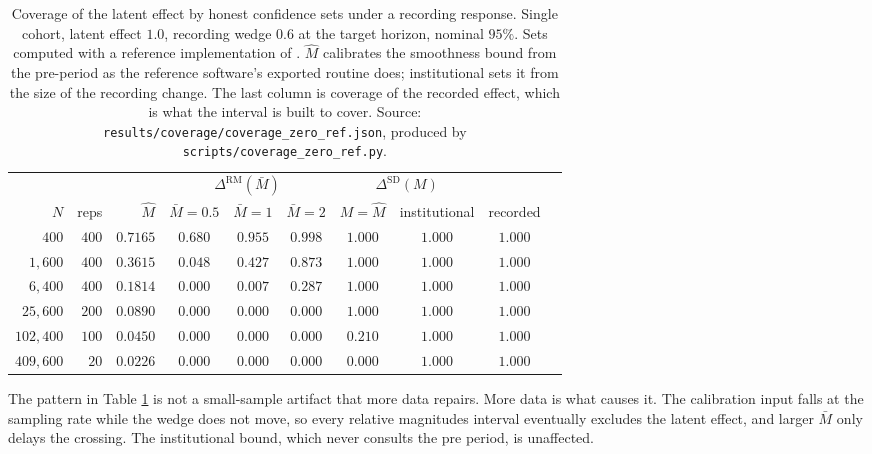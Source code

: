 \documentclass[12pt]{article}
\theoremstyle{definition}
\numberwithin{equation}{section}
\begin{document}
\begin{table}[t]
\centering
\caption{Coverage of the latent effect by honest confidence sets under a
recording response. Single cohort, latent effect $1.0$, recording wedge $0.6$ at
the target horizon, nominal $95\%$. Sets computed with a reference
implementation of \citet{rambachan2023credible}. $\widehat M$ calibrates the
smoothness bound from the pre-period as the reference software's exported
routine does; institutional sets it from the size of the recording change. The
last column is coverage of the recorded effect, which is what the interval is
built to cover. Source: \texttt{results/coverage/coverage\_zero\_ref.json},
produced by \texttt{scripts/coverage\_zero\_ref.py}.}
\label{tab:cov}
\begin{tabular}{rrrccccccc}
\toprule
& & & \multicolumn{3}{c}{$\Delta^{\mathrm{RM}}(\bar M)$}
& \multicolumn{2}{c}{$\Delta^{\mathrm{SD}}(M)$} & \\
\cmidrule(lr){4-6}\cmidrule(lr){7-8}
$N$ & reps & $\widehat M$ & $\bar M = 0.5$ & $\bar M = 1$ & $\bar M = 2$
& $M = \widehat M$ & institutional & recorded \\
\midrule
$400$ & $400$ & $0.7165$ & $0.680$ & $0.955$ & $0.998$ & $1.000$ & $1.000$ & $1.000$ \\
$1{,}600$ & $400$ & $0.3615$ & $0.048$ & $0.427$ & $0.873$ & $1.000$ & $1.000$ & $1.000$ \\
$6{,}400$ & $400$ & $0.1814$ & $0.000$ & $0.007$ & $0.287$ & $1.000$ & $1.000$ & $1.000$ \\
$25{,}600$ & $200$ & $0.0890$ & $0.000$ & $0.000$ & $0.000$ & $1.000$ & $1.000$ & $1.000$ \\
$102{,}400$ & $100$ & $0.0450$ & $0.000$ & $0.000$ & $0.000$ & $0.210$ & $1.000$ & $1.000$ \\
$409{,}600$ & $20$ & $0.0226$ & $0.000$ & $0.000$ & $0.000$ & $0.000$ & $1.000$ & $1.000$ \\
\bottomrule
\end{tabular}
\end{table}

The pattern in Table \ref{tab:cov} is not a small-sample artifact that more data
repairs. More data is what causes it. The calibration input falls at the
sampling rate while the wedge does not move, so every relative magnitudes
interval eventually excludes the latent effect, and larger $\bar M$ only delays
the crossing. The institutional bound, which never consults the pre period, is
unaffected.
\end{document}
